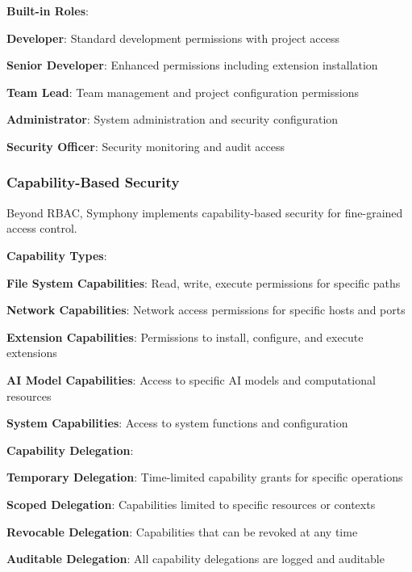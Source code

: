 \textbf{Built-in Roles}:
\begin{compactlist}
    \item \textbf{Developer}: Standard development permissions with project access
    \item \textbf{Senior Developer}: Enhanced permissions including extension installation
    \item \textbf{Team Lead}: Team management and project configuration permissions
    \item \textbf{Administrator}: System administration and security configuration
    \item \textbf{Security Officer}: Security monitoring and audit access
\end{compactlist}

\subsubsection*{Capability-Based Security}

Beyond RBAC, Symphony implements capability-based security for fine-grained access control.

\textbf{Capability Types}:
\begin{compactlist}
    \item \textbf{File System Capabilities}: Read, write, execute permissions for specific paths
    \item \textbf{Network Capabilities}: Network access permissions for specific hosts and ports
    \item \textbf{Extension Capabilities}: Permissions to install, configure, and execute extensions
    \item \textbf{AI Model Capabilities}: Access to specific AI models and computational resources
    \item \textbf{System Capabilities}: Access to system functions and configuration
\end{compactlist}

\textbf{Capability Delegation}:
\begin{compactlist}
    \item \textbf{Temporary Delegation}: Time-limited capability grants for specific operations
    \item \textbf{Scoped Delegation}: Capabilities limited to specific resources or contexts
    \item \textbf{Revocable Delegation}: Capabilities that can be revoked at any time
    \item \textbf{Auditable Delegation}: All capability delegations are logged and auditable
\end{compactlist}

